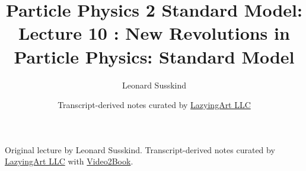 \documentclass[11pt,oneside]{book}
\begin{document}
\frontmatter
\title{Particle Physics 2 Standard Model: Lecture 10 : New Revolutions in Particle Physics: Standard Model}
\author{Leonard Susskind}
\date{Transcript-derived notes curated by \href{https://lazying.art}{LazyingArt LLC}}
\maketitle
\begin{center}
\small Original lecture by Leonard Susskind. Transcript-derived notes curated by \href{https://lazying.art}{LazyingArt LLC} with \href{https://github.com/lachlanchen/Video2Book}{Video2Book}.
\end{center}
\clearpage
\mainmatter

\end{document}
